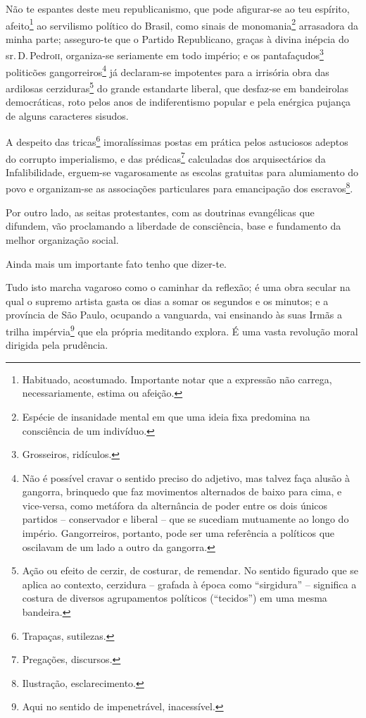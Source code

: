 Não te espantes deste meu republicanismo, que pode afigurar-se ao teu
espírito, afeito\footnote{ Habituado, acostumado. Importante notar que
  a expressão não carrega, necessariamente, estima ou afeição.} ao
servilismo político do Brasil, como sinais de {monomania}\footnote{
  Espécie de insanidade mental em que uma ideia fixa predomina na
  consciência de um indivíduo.} {arrasadora} da minha parte; asseguro-te
que o Partido Republicano, graças à divina inépcia do sr.\,D.\,Pedro\textsc{ii},
organiza-se seriamente em todo império; e os pantafaçudos\footnote{
  Grosseiros, ridículos.} politicões gangorreiros\footnote{ Não é
  possível cravar o sentido preciso do adjetivo, mas talvez faça alusão
  à gangorra, brinquedo que faz movimentos alternados de baixo para
  cima, e vice-versa, como metáfora da alternância de poder entre os
  dois únicos partidos -- conservador e liberal -- que se sucediam
  mutuamente ao longo do império. Gangorreiros, portanto, pode ser uma
  referência a políticos que oscilavam de um lado a outro da gangorra.}
já declaram-se impotentes para a irrisória obra das ardilosas
cerziduras\footnote{ Ação ou efeito de cerzir, de costurar, de
  remendar. No sentido figurado que se aplica ao contexto, cerzidura --
  grafada à época como ``sirgidura'' -- significa a costura de diversos
  agrupamentos políticos (``tecidos'') em uma mesma bandeira.} do g{rande
estandarte liberal}, que desfaz-se em bandeirolas democráticas, roto
pelos anos de indiferentismo popular e pela enérgica pujança de alguns
caracteres sisudos.

A despeito das tricas\footnote{ Trapaças, sutilezas.} imoralíssimas
postas em prática pelos astuciosos adeptos do corrupto imperialismo, e
das prédicas\footnote{ Pregações, discursos.} calculadas dos
arquisectários da {Infalibilidade}, erguem-se vagarosamente as escolas
gratuitas para alumiamento do povo e organizam-se as associações
particulares para emancipação dos escravos\footnote{ Ilustração,
  esclarecimento.}.

Por outro lado, as seitas protestantes, com as doutrinas evangélicas que
difundem, vão proclamando a liberdade de consciência, base e fundamento
da melhor organização social.

Ainda mais um importante fato tenho que dizer-te.

Tudo isto marcha vagaroso como o caminhar da reflexão; é uma obra
secular na qual o {supremo artista} gasta os dias a somar os segundos e
os minutos; e a província de São Paulo, ocupando a vanguarda, vai
ensinando às suas Irmãs a trilha impérvia\footnote{ Aqui no sentido de
  impenetrável, inacessível.} que ela própria meditando explora. É uma
vasta revolução moral dirigida pela prudência.

